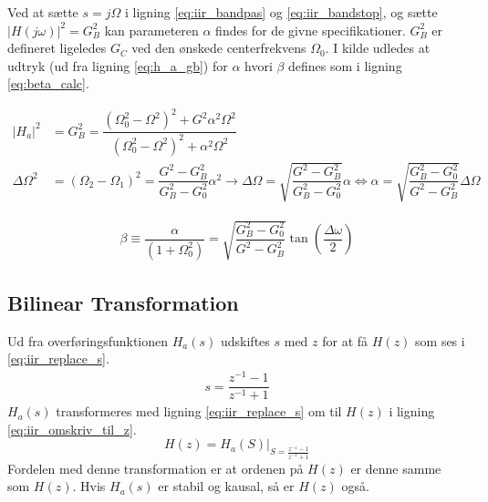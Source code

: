    Ved at sætte $s = j \Omega$ i ligning \ref{eq:iir_bandpas} og \ref{eq:iir_bandstop}, og sætte $\big| H(j\omega)\big|^2 = G_B^2$ kan parameteren $\alpha$ findes for de givne specifikationer. $G_B^2$ er defineret ligeledes $G_C$ ved den ønskede centerfrekvens $\Omega_0$.
   I kilde \cite{Orfanidis1996} udledes at udtryk (ud fra ligning \ref{eq:h_a_gb}) for $\alpha$ hvori $\beta$ defines som i ligning \ref{eq:beta_calc}.

    \begin{align}
        |H_{a}|^2 &= G_B^2 =  \dfrac{(\Omega_0^2- \Omega^2)^2 + G^2 \alpha^2 \Omega^2}{(\Omega_0^2-\Omega^2)^2 +\alpha^2 \Omega^2}  %
        \label{eq:h_a_gb}\\
       \Delta \Omega^2 &= (\Omega_2 - \Omega_1 )^2 = \dfrac{G^2 - G_B^2}{G_B^2 - G_0^2}  \alpha^2 \rightarrow \Delta \Omega = \sqrt{\dfrac{G^2 - G_B^2}{G_B^2 - G_0^2}} \alpha \iff \alpha = \sqrt{\dfrac{G_B^2-G_0^2}{G^2 - G_B^2 }} \Delta \Omega
       \label{eq:beta_calc}
    \end{align}


    \begin{align}
    \beta \equiv \dfrac{\alpha}{(1 + \Omega_0^2)}    = \sqrt{\dfrac{G_B^2-G_0^2}{G^2 - G_B^2 }} \tan \left( \dfrac{\Delta \omega}{2} \right) \label{eq:beta}
    \end{align}


    \subsection{Bilinear Transformation}
    Ud fra overføringsfunktionen $H_a(s)$ udskiftes $s$ med $z$ for at få $H(z)$ som ses i \ref{eq:iir_replace_s}.
    \begin{align}
    s =   \dfrac{z^{-1} - 1}{z^{-1} + 1} \label{eq:iir_replace_s}
    \end{align}
	$H_a(s)$ transformeres med ligning \ref{eq:iir_replace_s} om til $H(z)$ i ligning \ref{eq:iir_omskriv_til_z}.
    \begin{equation}
    H(z) = H_a(S)\bigg|_{S = \frac{z^{-1} -1 }{z^{-1} + 1}} \label{eq:iir_omskriv_til_z}
    \end{equation}
    Fordelen med denne transformation er at ordenen på $H(z)$ er denne samme som $H(z)$. Hvis $H_a(s)$ er stabil og kausal, så er $H(z)$ også.
    
